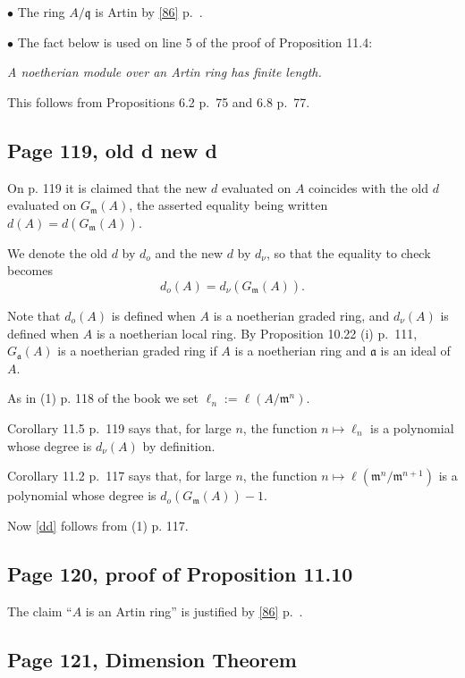 \documentclass[parskip=half,fontsize=12pt]{scrartcl}%
\newcommand{\mf}{\mathfrak}
\newcommand{\mmm}{\mf m}
\newcommand{\bu}{\bullet}
\begin{document}
$\bu$ The ring $A/\mf q$ is Artin by \eqref{86} p.~\pageref{86}.

$\bu$ The fact below is used on line 5 of the proof of Proposition 11.4:

\emph{A noetherian module over an Artin ring has finite length.}

This follows from Propositions 6.2 p.~75 and 6.8 p.~77.

\subsection{Page 119, old d new d}\label{odnd}%

On p. 119 it is claimed that the new $d$ evaluated on $A$ coincides with the old $d$ evaluated on $G_\mmm(A)$, the asserted equality being written $d(A)=d(G_\mmm(A))$. 

We denote the old $d$ by $d_o$ and the new $d$ by $d_\nu$, so that the equality to check becomes 
\begin{equation}\label{dd}
d_o(A)=d_\nu(G_\mmm(A)).
\end{equation}

Note that $d_o(A)$ is defined when $A$ is a noetherian graded ring, and $d_\nu(A)$ is defined when $A$ is a noetherian local ring. By Proposition 10.22 (i) p.~111, $G_{\mf a}(A)$ is a noetherian graded ring if $A$ is a noetherian ring and $\mf a$ is an ideal of $A$.

As in (1) p. 118 of the book we set $\ell_n:=\ell(A/\mf m^n)$. 

Corollary 11.5 p.~119 says that, for large $n$, the function $n\mapsto\ell_n$ is a polynomial whose degree is $d_\nu(A)$ by definition. 

Corollary 11.2 p.~117 says that, for large $n$, the function $n\mapsto\ell(\mf m^n/\mf m^{n+1})$ is a polynomial whose degree is $d_o(G_\mmm(A))-1$.

Now \eqref{dd} follows from (1) p. 117.

\subsection{Page 120, proof of Proposition 11.10}%

The claim ``$A$ is an Artin ring'' is justified by \eqref{86} p.~\pageref{86}.

\subsection{Page 121, Dimension Theorem}\label{dt}%
\end{document}
